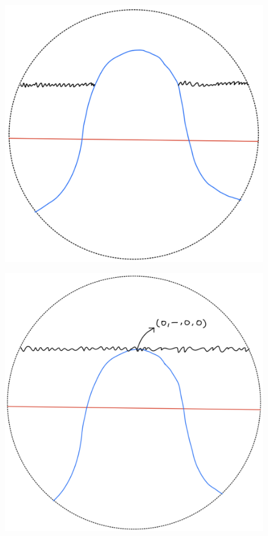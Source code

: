 \begin{definition}
\begin{enumerate}
\begin{itemize}
\begin{figure}[H]
    \centering
    \includegraphics[scale = 0.45]{diagrams/lemma2/22.png} 
    \caption{}
    \label{fig:your-label}
\end{figure}
\begin{figure}[H]
    \centering
    \includegraphics[scale = 0.45]{diagrams/lemma2/23.png} 

\end{figure}
\end{itemize}
\end{enumerate}
\end{definition}
